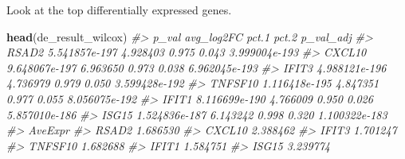 \documentclass[
]{book}
\newenvironment{Shaded}{\begin{snugshade}}{\end{snugshade}}
\newcommand{\CommentTok}[1]{\textcolor[rgb]{0.56,0.35,0.01}{\textit{#1}}}
\newcommand{\FunctionTok}[1]{\textcolor[rgb]{0.13,0.29,0.53}{\textbf{#1}}}
\newcommand{\NormalTok}[1]{#1}
\begin{document}
Look at the top differentially expressed genes.

\begin{Shaded}
\begin{Highlighting}[]
\FunctionTok{head}\NormalTok{(de\_result\_wilcox)}
\CommentTok{\#\textgreater{}                 p\_val avg\_log2FC pct.1 pct.2     p\_val\_adj}
\CommentTok{\#\textgreater{} RSAD2   5.541857e{-}197   4.928403 0.975 0.043 3.999004e{-}193}
\CommentTok{\#\textgreater{} CXCL10  9.648067e{-}197   6.963650 0.973 0.038 6.962045e{-}193}
\CommentTok{\#\textgreater{} IFIT3   4.988121e{-}196   4.736979 0.979 0.050 3.599428e{-}192}
\CommentTok{\#\textgreater{} TNFSF10 1.116418e{-}195   4.847351 0.977 0.055 8.056075e{-}192}
\CommentTok{\#\textgreater{} IFIT1   8.116699e{-}190   4.766009 0.950 0.026 5.857010e{-}186}
\CommentTok{\#\textgreater{} ISG15   1.524836e{-}187   6.143242 0.998 0.320 1.100322e{-}183}
\CommentTok{\#\textgreater{}          AveExpr}
\CommentTok{\#\textgreater{} RSAD2   1.686530}
\CommentTok{\#\textgreater{} CXCL10  2.388462}
\CommentTok{\#\textgreater{} IFIT3   1.701247}
\CommentTok{\#\textgreater{} TNFSF10 1.682688}
\CommentTok{\#\textgreater{} IFIT1   1.584751}
\CommentTok{\#\textgreater{} ISG15   3.239774}
\end{Highlighting}
\end{Shaded}
\end{document}
